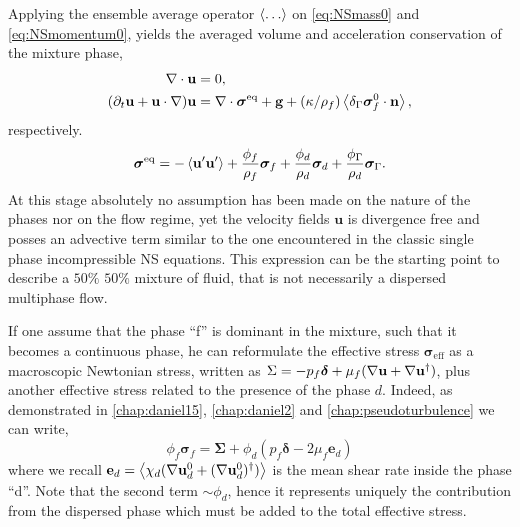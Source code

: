 Applying the ensemble average operator $\left<\ldots\right>$ on \ref{eq:NSmass0} and \ref{eq:NSmomentum0}, yields the averaged volume and acceleration conservation of the mixture phase, 
\begin{align}
    \div\textbf{u} &=0,\\
    (\pddt \textbf{u}  
    + \textbf{u} \cdot \grad )
    \textbf{u}
    &= 
    \div \bm{\sigma}^\text{eq} + 
    \textbf{g} 
    + (\kappa/\rho_f) \avg{\delta_\Gamma \bm{\sigma}_f^0 \cdot \textbf{n}},
    \label{eq:NS_firststep}
\end{align}
respectively. 
\begin{equation}
    \bm\sigma^\text{eq} = 
    - \left< \textbf{u}'\textbf{u}'\right>
    + \frac{\phi_f}{\rho_f}\bm\sigma_f
    + \frac{\phi_d}{\rho_d}\bm\sigma_d
    + \frac{\phi_\Gamma}{\rho_d} \bm\sigma_\Gamma. 
\end{equation}
At this stage absolutely no assumption has been made on the nature of the phases nor on the flow regime, yet the velocity fields $\textbf{u}$ is divergence free and posses an advective term similar to the one encountered in the classic single phase incompressible NS equations.
This expression can be the starting point to describe a $50\%$ $50\%$ mixture of fluid, that is not necessarily a dispersed multiphase flow. 

If one assume that the phase ``f'' is dominant in the mixture, such that it becomes a continuous phase, he can reformulate the effective stress $\bm\sigma_\text{eff}$ as a macroscopic Newtonian stress, written as $\Sigma = -  p_f \bm\delta  + \mu_f(\mathbf{\nabla} \textbf{u} + \mathbf{\nabla} \textbf{u}^\dagger)$, plus another effective stress related to the presence of the phase $d$.
Indeed, as demonstrated in \ref{chap:daniel15}, \ref{chap:daniel2} and \ref{chap:pseudoturbulence} we can write,
\begin{equation}
    \phi_f\bm\sigma_f
    = \bm\Sigma
    + \phi_d (p_f\bm\delta - 2\mu_f \textbf{e}_d)
    \label{eq:stress_formulation}
\end{equation}
where we recall $\textbf{e}_d = \left<\chi_d (\mathbf{\nabla} \textbf{u}_d^0+(\mathbf{\nabla} \textbf{u}_d^0)^\dagger)\right>$ is the mean shear rate inside the phase ``d''. 
Note that the second term $\sim \phi_d$, hence it represents uniquely the contribution from the dispersed phase which must be added to the total effective stress. 

